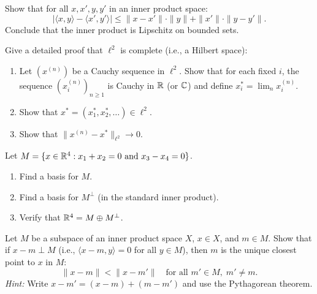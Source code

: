 \documentclass[11pt,a4paper]{article}
\begin{document}
\begin{exercise}
\label{ex:ip_quantitative}
Show that for all $x, x', y, y'$ in an inner product space:
\[
|\langle x, y \rangle - \langle x', y' \rangle|
\le \|x - x'\| \cdot \|y\| + \|x'\| \cdot \|y - y'\|.
\]
Conclude that the inner product is Lipschitz on bounded sets.
\end{exercise}

\begin{exercise}
\label{ex:ell2_complete}
Give a detailed proof that $\ell^2$ is complete (i.e., a Hilbert space):
\begin{enumerate}[label=(\alph*),nosep]
    \item Let $(x^{(n)})$ be a Cauchy sequence in $\ell^2$. Show that for
          each fixed $i$, the sequence $(x_i^{(n)})_{n \ge 1}$ is Cauchy in
          $\mathbb{R}$ (or $\mathbb{C}$) and define $x_i^* = \lim_{n} x_i^{(n)}$.
    \item Show that $x^* = (x_1^*, x_2^*, \ldots) \in \ell^2$.
    \item Show that $\|x^{(n)} - x^*\|_{\ell^2} \to 0$.
\end{enumerate}
\end{exercise}

\begin{exercise}
\label{ex:orth_comp_Rn}
Let $M = \{x \in \mathbb{R}^4 : x_1 + x_2 = 0 \text{ and } x_3 - x_4 = 0\}$.
\begin{enumerate}[label=(\alph*),nosep]
    \item Find a basis for $M$.
    \item Find a basis for $M^\perp$ (in the standard inner product).
    \item Verify that $\mathbb{R}^4 = M \oplus M^\perp$.
\end{enumerate}
\end{exercise}

\begin{exercise}
\label{ex:pythag_approx}
Let $M$ be a subspace of an inner product space $X$, $x \in X$, and
$m \in M$. Show that if $x - m \perp M$ (i.e., $\langle x - m, y \rangle =
0$ for all $y \in M$), then $m$ is the unique closest point to $x$ in $M$:
\[
\|x - m\| < \|x - m'\| \quad \text{for all } m' \in M, \; m' \ne m.
\]
\textit{Hint:} Write $x - m' = (x - m) + (m - m')$ and use the Pythagorean
theorem.
\end{exercise}
\end{document}
